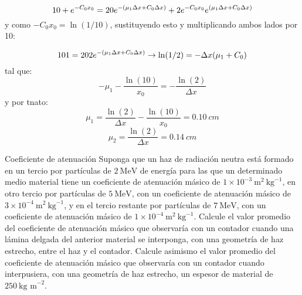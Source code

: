 \begin{equation}
    10 + e^{-C_0 x_0} = 20 e^{-\pqty{\mu_1\Delta x+C_0 \Delta x}} +2 e^{-C_0x_0} e^{\pqty{\mu_1\Delta x+C_0 \Delta x}}
\end{equation}
y como $-C_0x_0=\ln(1/10)$, sustituyendo esto y multiplicando ambos lados por 10: 

\begin{equation}
    101 = 202 e^{-\pqty{\mu_1\Delta x+C_0 \Delta x}}  \to \ln(1/2) = - \Delta x (\mu_1 + C_0) 
\end{equation}
tal que:
\begin{equation}
    -\mu_1 -  \frac{\ln(10)}{x_0}= -\frac{\ln(2)}{\Delta x}
\end{equation}
y por tnato: 
\begin{equation}
    \mu_1 =\frac{\ln(2)}{\Delta x} - \frac{\ln(10)}{x_0} = 0.10 \ \unit{cm}
\end{equation}
\begin{equation}
    \mu_2 = \frac{\ln(2)}{\Delta x} = 0.14  \ \unit{cm}
\end{equation}


\begin{Ejercicio}{Coeficiente de atenuación }
Suponga que un haz de radiación neutra está formado en un tercio por partículas de $2\ \text{MeV}$ de energía para las que un determinado medio material tiene un coeficiente de atenuación másico de $1 \times 10^{-3}\ \text{m}^2\ \text{kg}^{-1}$, en otro tercio por partículas de $5\ \text{MeV}$, con un coeficiente de atenuación másico de $3 \times 10^{-4}\ \text{m}^2\ \text{kg}^{-1}$, y en el tercio restante por partículas de $7\ \text{MeV}$, con un coeficiente de atenuación másico de $1 \times 10^{-4}\ \text{m}^2\ \text{kg}^{-1}$. Calcule el valor promedio del coeficiente de atenuación másico que observaría con un contador cuando una lámina delgada del anterior material se interponga, con una geometría de haz estrecho, entre el haz y el contador. Calcule asimismo el valor promedio del coeficiente de atenuación másico que observaría con un contador cuando interpusiera, con una geometría de haz estrecho, un espesor de material de $250\ \text{kg m}^{-2}$.
\end{Ejercicio}

